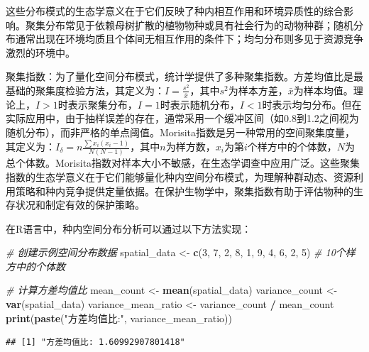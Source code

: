 \documentclass[
  twoside,12pt,fontset=none]{ctexbook}
\newenvironment{Shaded}{\begin{snugshade}}{\end{snugshade}}
\newcommand{\CommentTok}[1]{\textcolor[rgb]{0.56,0.35,0.01}{\textit{#1}}}
\newcommand{\DecValTok}[1]{\textcolor[rgb]{0.00,0.00,0.81}{#1}}
\newcommand{\FunctionTok}[1]{\textcolor[rgb]{0.13,0.29,0.53}{\textbf{#1}}}
\newcommand{\NormalTok}[1]{#1}
\newcommand{\OtherTok}[1]{\textcolor[rgb]{0.56,0.35,0.01}{#1}}
\newcommand{\SpecialCharTok}[1]{\textcolor[rgb]{0.81,0.36,0.00}{\textbf{#1}}}
\newcommand{\StringTok}[1]{\textcolor[rgb]{0.31,0.60,0.02}{#1}}
\begin{document}
这些分布模式的生态学意义在于它们反映了种内相互作用和环境异质性的综合影响。聚集分布常见于依赖母树扩散的植物物种或具有社会行为的动物种群；随机分布通常出现在环境均质且个体间无相互作用的条件下；均匀分布则多见于资源竞争激烈的环境中。

聚集指数：为了量化空间分布模式，统计学提供了多种聚集指数。方差均值比是最基础的聚集度检验方法，其定义为：\(I = \frac{s^2}{\bar{x}}\)，其中\(s^2\)为样本方差，\(\bar{x}\)为样本均值。理论上，\(I > 1\)时表示聚集分布，\(I = 1\)时表示随机分布，\(I < 1\)时表示均匀分布。但在实际应用中，由于抽样误差的存在，通常采用一个缓冲区间（如0.8到1.2之间视为随机分布），而非严格的单点阈值。Morisita指数是另一种常用的空间聚集度量，其定义为：\(I_\delta = n \frac{\sum x_i(x_i-1)}{N(N-1)}\)，其中\(n\)为样方数，\(x_i\)为第\(i\)个样方中的个体数，\(N\)为总个体数。Morisita指数对样本大小不敏感，在生态学调查中应用广泛。这些聚集指数的生态学意义在于它们能够量化种内空间分布模式，为理解种群动态、资源利用策略和种内竞争提供定量依据。在保护生物学中，聚集指数有助于评估物种的生存状况和制定有效的保护策略。

在R语言中，种内空间分布分析可以通过以下方法实现：

\begin{Shaded}
\begin{Highlighting}[]
\CommentTok{\# 创建示例空间分布数据}
\NormalTok{spatial\_data }\OtherTok{\textless{}{-}} \FunctionTok{c}\NormalTok{(}\DecValTok{3}\NormalTok{, }\DecValTok{7}\NormalTok{, }\DecValTok{2}\NormalTok{, }\DecValTok{8}\NormalTok{, }\DecValTok{1}\NormalTok{, }\DecValTok{9}\NormalTok{, }\DecValTok{4}\NormalTok{, }\DecValTok{6}\NormalTok{, }\DecValTok{2}\NormalTok{, }\DecValTok{5}\NormalTok{) }\CommentTok{\# 10个样方中的个体数}

\CommentTok{\# 计算方差均值比}
\NormalTok{mean\_count }\OtherTok{\textless{}{-}} \FunctionTok{mean}\NormalTok{(spatial\_data)}
\NormalTok{variance\_count }\OtherTok{\textless{}{-}} \FunctionTok{var}\NormalTok{(spatial\_data)}
\NormalTok{variance\_mean\_ratio }\OtherTok{\textless{}{-}}\NormalTok{ variance\_count }\SpecialCharTok{/}\NormalTok{ mean\_count}
\FunctionTok{print}\NormalTok{(}\FunctionTok{paste}\NormalTok{(}\StringTok{"方差均值比:"}\NormalTok{, variance\_mean\_ratio))}
\end{Highlighting}
\end{Shaded}

\begin{verbatim}
## [1] "方差均值比: 1.60992907801418"
\end{verbatim}
\end{document}
